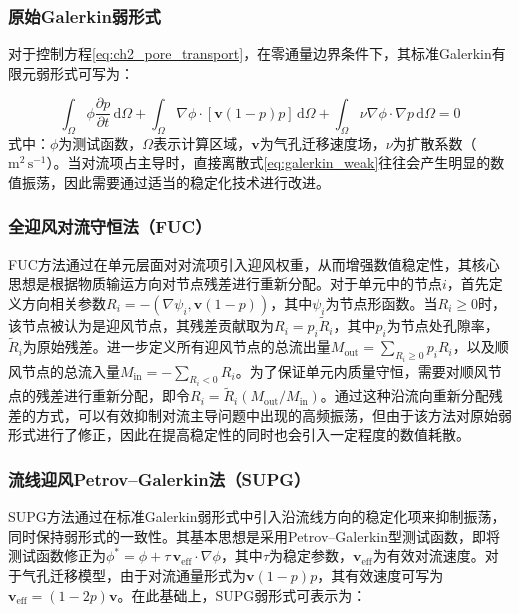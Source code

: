 \subsubsection{原始Galerkin弱形式}

对于控制方程\eqref{eq:ch2_pore_transport}，在零通量边界条件下，其标准Galerkin有限元弱形式可写为：

\begin{equation}
	\int_\Omega
	\phi
	\frac{\partial p}{\partial t}
	\,\mathrm d\Omega
	+
	\int_\Omega
	\nabla \phi
	\cdot
	[\mathbf{v}(1-p)p]
	\,\mathrm d\Omega
	+
	\int_\Omega
	\nu
	\nabla \phi
	\cdot
	\nabla p
	\,\mathrm d\Omega
	=0 
	\label{eq:galerkin_weak}
\end{equation}
\noindent 式中：$\phi$为测试函数，$\Omega$表示计算区域，$\mathbf v$为气孔迁移速度场，$\nu$为扩散系数（$\mathrm{m^2\,s^{-1}}$）。当对流项占主导时，直接离散式\eqref{eq:galerkin_weak}往往会产生明显的数值振荡，因此需要通过适当的稳定化技术进行改进。

\subsubsection{全迎风对流守恒法（FUC）}

FUC方法\cite{adhikaryAnalysisFiniteElement2011}通过在单元层面对对流项引入迎风权重，从而增强数值稳定性，其核心思想是根据物质输运方向对节点残差进行重新分配。对于单元中的节点$i$，首先定义方向相关参数$R_i=-(\nabla\psi_i,\mathbf v(1-p))$，其中$\psi_i$为节点形函数。当$R_i\ge0$时，该节点被认为是迎风节点，其残差贡献取为$R_i=p_i\tilde R_i$，其中$p_i$为节点处孔隙率，$\tilde R_i$为原始残差。进一步定义所有迎风节点的总流出量$M_{\mathrm{out}}=\sum_{R_i\ge0}p_iR_i$，以及顺风节点的总流入量$M_{\mathrm{in}}=-\sum_{R_i<0}R_i$。为了保证单元内质量守恒，需要对顺风节点的残差进行重新分配，即令$R_i=\tilde R_i(M_{\mathrm{out}}/M_{\mathrm{in}})$。通过这种沿流向重新分配残差的方式，可以有效抑制对流主导问题中出现的高频振荡，但由于该方法对原始弱形式进行了修正，因此在提高稳定性的同时也会引入一定程度的数值耗散。

\subsubsection{流线迎风Petrov--Galerkin法（SUPG）}

SUPG方法\cite{brooksStreamlineUpwindPetrovgalerkin1982,johnsonFiniteElementMethods1984}通过在标准Galerkin弱形式中引入沿流线方向的稳定化项来抑制振荡，同时保持弱形式的一致性。其基本思想是采用Petrov--Galerkin型测试函数，即将测试函数修正为$\phi^*=\phi+\tau\,\mathbf v_{\mathrm{eff}}\cdot\nabla\phi$，其中$\tau$为稳定参数，$\mathbf v_{\mathrm{eff}}$为有效对流速度。对于气孔迁移模型，由于对流通量形式为$\mathbf v(1-p)p$，其有效速度可写为$\mathbf v_{\mathrm{eff}}=(1-2p)\mathbf v$。在此基础上，SUPG弱形式可表示为：

